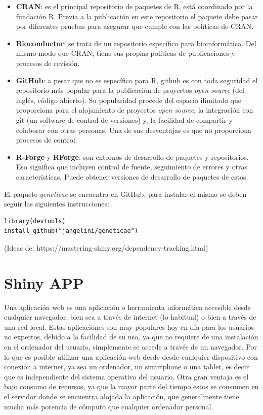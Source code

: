 \begin{itemize}
\item \textbf{CRAN}: es el principal repositorio de paquetes de R, está coordinado por la fundación R. Previa a la publicación en este repositorio el paquete debe pasar por diferentes pruebas para asegurar que cumple con las políticas de CRAN.

\item \textbf{Bioconductor}: se trata de un repositorio específico para bioinformática. Del mismo modo que CRAN, tiene sus propias políticas de publicaciones y procesos de revisión.

\item \textbf{GitHub}: a pesar que no es específico para R, github es con toda seguridad el repositorio más popular para la publicación de proyectos \emph{open source} (del inglés, código abierto). Su popularidad procede del espacio ilimitado que proporciona para el alojamiento de proyectos \emph{open source}, la integración con git (un software de control de versiones) y, la facilidad de compartir y colaborar con otras personas. Una de sus desventajas es que no proporciona procesos de control.

\item \textbf{R-Forge} y \textbf{RForge}: son entornos de desarrollo de paquetes y repositorios. Eso significa que incluyen control de fuente, seguimiento de errores y otras características. Puede obtener versiones de desarrollo de paquetes de estos.
\end{itemize}

El paquete \emph{geneticae} se encuentra en GitHub, para instalar el mismo se deben seguir las siguientes instrucciones:\\


\begin{lstlisting}
library(devtools)
install_github("jangelini/geneticae") 
\end{lstlisting}





{\Huge{(Ideas de: https://mastering-shiny.org/dependency-tracking.html)}}

\section{Shiny APP}
Una aplicación web es una aplicación o herramienta informática accesible desde cualquier navegador, bien sea a través de internet (lo habitual) o bien a través de una red local. 
Estas aplicaciones son muy populares hoy en día para los usuarios no expertos, debido a la facilidad de su uso, ya que no requiere de una instalación en el ordenador del usuario, simplemente se accede a través de un navegador. Por lo que es posible utilizar una aplicación web desde desde cualquier dispositivo con conexión a internet, ya sea un ordenador, un smartphone o una tablet, es decir que es independiente del sistema operativo del usuario. Otra gran ventaja es el bajo consumo de recursos, ya que la mayor parte del tiempo estos se consumen en el servidor donde se encuentra alojada la aplicación, que generalmente tiene mucha más potencia de cómputo que cualquier ordenador personal.


